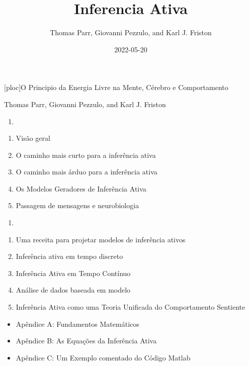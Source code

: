 \documentclass[
]{book}
\title{Inferencia Ativa}
\author{Thomas Parr, Giovanni Pezzulo, and Karl J. Friston}
\date{2022-05-20}
\providecommand{\tightlist}{%
  \setlength{\itemsep}{0pt}\setlength{\parskip}{0pt}}
\begin{document}
\maketitle

{
\setcounter{tocdepth}{1}
\tableofcontents
}
{[}ploc{]}O Principio da Energia Livre na Mente, Cérebro e Comportamento

Thomas Parr, Giovanni Pezzulo, and Karl J. Friston

\begin{enumerate}
\def\labelenumi{(\Roman{enumi})}
\tightlist
\item
\end{enumerate}

\begin{enumerate}
\def\labelenumi{\arabic{enumi}.}
\tightlist
\item
  Visão geral\\
\item
  O caminho mais curto para a inferência ativa\\
\item
  O caminho mais árduo para a inferência ativa\\
\item
  Os Modelos Geradores de Inferência Ativa\\
\item
  Passagem de mensagens e neurobiologia
\end{enumerate}

\begin{enumerate}
\def\labelenumi{(\Roman{enumi})}
\setcounter{enumi}{1}
\tightlist
\item
\end{enumerate}

\begin{enumerate}
\def\labelenumi{\arabic{enumi}.}
\setcounter{enumi}{5}
\tightlist
\item
  Uma receita para projetar modelos de inferência ativos
\item
  Inferência ativa em tempo discreto
\item
  Inferência Ativa em Tempo Contínuo
\item
  Análise de dados baseada em modelo
\item
  Inferência Ativa como uma Teoria Unificada do Comportamento Sentiente
\end{enumerate}

\begin{itemize}
\tightlist
\item
  Apêndice A: Fundamentos Matemáticos
\item
  Apêndice B: As Equações da Inferência Ativa
\item
  Apêndice C: Um Exemplo comentado do Código Matlab
\end{itemize}
\end{document}
